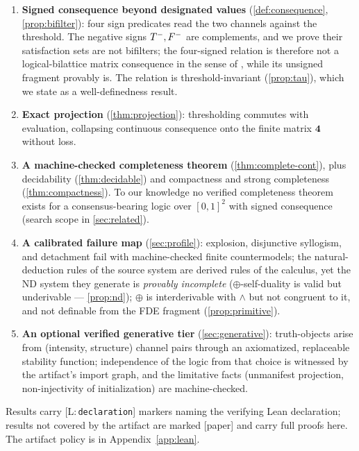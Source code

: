 \documentclass[11pt,a4paper]{article}
\theoremstyle{definition}
\newcommand{\FOUR}{\mathbf{4}}
\newcommand{\hmz}{\oplus}                       %
\begin{document}
\begin{enumerate}
\item \textbf{Signed consequence beyond designated values}
  (\cref{def:consequence}, \cref{prop:bifilter}): four sign predicates read
  the two channels against the threshold. The negative signs $T^{-},F^{-}$ are
  complements, and we prove their satisfaction sets are not bifilters; the
  four-signed relation is therefore not a logical-bilattice matrix
  consequence in the sense of \cite{arieli1996reasoning}, while its unsigned
  fragment provably is. The relation is threshold-invariant
  (\cref{prop:tau}), which we state as a well-definedness result.
\item \textbf{Exact projection} (\cref{thm:projection}): thresholding
  commutes with evaluation, collapsing continuous consequence onto the
  finite matrix $\FOUR$ without loss.
\item \textbf{A machine-checked completeness theorem}
  (\cref{thm:complete-cont}), plus decidability (\cref{thm:decidable}) and
  compactness and strong completeness
  (\cref{thm:compactness}). To our knowledge no verified completeness
  theorem exists for a consensus-bearing logic over $[0,1]^2$ with signed
  consequence (search scope in \cref{sec:related}).
\item \textbf{A calibrated failure map} (\cref{sec:profile}): explosion,
  disjunctive syllogism, and detachment fail with machine-checked finite
  countermodels; the natural-deduction rules of the source system are
  derived rules of the calculus, yet the ND system they generate is
  \emph{provably incomplete} ($\hmz$-self-duality is valid but underivable
  --- \cref{prop:nd}); $\hmz$ is interderivable with $\wedge$ but not
  congruent to it, and not definable from the FDE fragment
  (\cref{prop:primitive}).
\item \textbf{An optional verified generative tier} (\cref{sec:generative}):
  truth-objects arise from (intensity, structure) channel pairs through an
  axiomatized, replaceable stability function; independence of the logic
  from that choice is witnessed by the artifact's import graph, and the
  limitative facts (unmanifest projection, non-injectivity of
  initialization) are machine-checked.
\end{enumerate}

Results carry [L:\,\texttt{declaration}] markers naming the verifying Lean
declaration; results not covered by the artifact are marked [paper] and
carry full proofs here. The artifact policy is in
Appendix~\ref{app:lean}.
\end{document}
